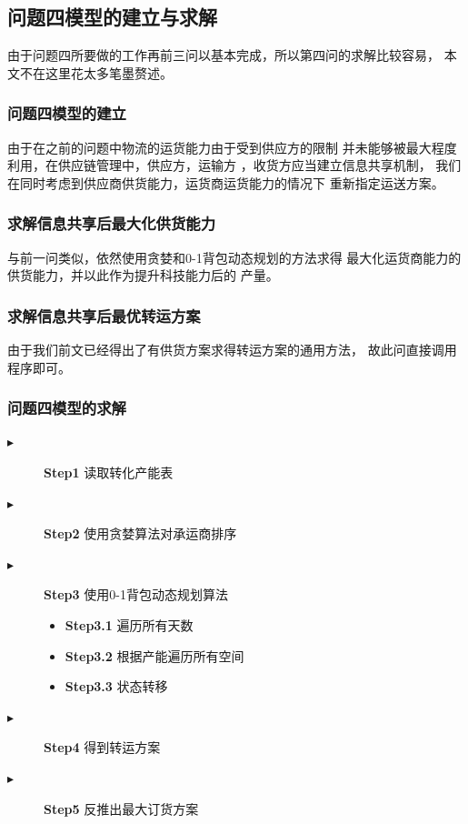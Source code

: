 \documentclass[withoutpreface,bwprint]{cumcmthesis}
\begin{document}
\subsection{问题四模型的建立与求解}
由于问题四所要做的工作再前三问以基本完成，所以第四问的求解比较容易，
本文不在这里花太多笔墨赘述。
\subsubsection{问题四模型的建立}
由于在之前的问题中物流的运货能力由于受到供应方的限制
并未能够被最大程度利用，在供应链管理中，供应方，运输方
，收货方应当建立信息共享机制，
我们在同时考虑到供应商供货能力，运货商运货能力的情况下
重新指定运送方案。
\subsubsection*{求解信息共享后最大化供货能力}
与前一问类似，依然使用贪婪和0-1背包动态规划的方法求得
最大化运货商能力的供货能力，并以此作为提升科技能力后的
产量。
\subsubsection*{求解信息共享后最优转运方案}
由于我们前文已经得出了有供货方案求得转运方案的通用方法，
故此问直接调用程序即可。

\subsubsection{问题四模型的求解}
\begin{description}
    \item[$\blacktriangleright$] \textbf{Step1} 读取转化产能表
    \item[$\blacktriangleright$] \textbf{Step2} 使用贪婪算法对承运商排序
    \item[$\blacktriangleright$] \textbf{Step3} 使用0-1背包动态规划算法
        \begin{itemize}
            \item \textbf{Step3.1} 遍历所有天数
            \item \textbf{Step3.2} 根据产能遍历所有空间
            \item \textbf{Step3.3} 状态转移
        \end{itemize}
    \item[$\blacktriangleright$] \textbf{Step4} 得到转运方案
    \item[$\blacktriangleright$] \textbf{Step5} 反推出最大订货方案
\end{description}
\end{document}
